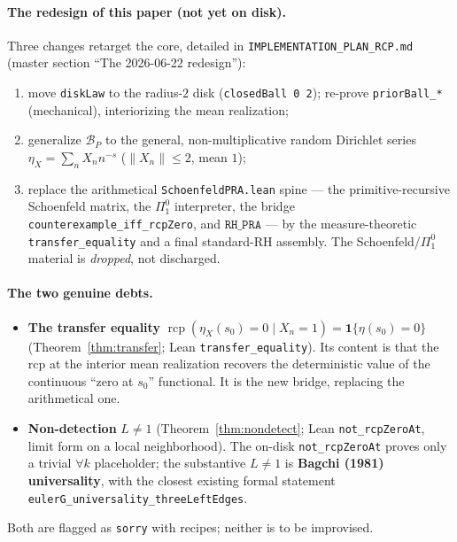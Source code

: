 \documentclass[11pt,a4paper]{article}
\theoremstyle{definition}
\newcommand{\etaX}{\eta_X}
\newcommand{\rcp}{\operatorname{rcp}}
\begin{document}
\paragraph{The redesign of this paper (not yet on disk).} Three changes retarget the core,
detailed in \texttt{IMPLEMENTATION\_PLAN\_RCP.md} (master section ``The 2026-06-22
redesign''):
\begin{enumerate}
  \item[\textbf{(R)}] move \texttt{diskLaw} to the radius-\(2\) disk (\texttt{closedBall 0
        2}); re-prove \texttt{priorBall\_*} (mechanical), interiorizing the mean realization;
  \item[\textbf{(M)}] generalize \(\mathcal{B}_P\) to the general, non-multiplicative random
        Dirichlet series \(\etaX=\sum_n X_n n^{-s}\) (\(\|X_n\|\le2\), mean \(1\));
  \item[\textbf{(Z)}] replace the arithmetical \texttt{SchoenfeldPRA.lean} spine --- the
        primitive-recursive Schoenfeld matrix, the \(\Pi^0_1\) interpreter, the bridge
        \texttt{counterexample\_iff\_rcpZero}, and \(\texttt{RH\_PRA}\) --- by the
        measure-theoretic \texttt{transfer\_equality} and a final standard-RH assembly. The
        Schoenfeld/\(\Pi^0_1\) material is \emph{dropped}, not discharged.
\end{enumerate}

\paragraph{The two genuine debts.}
\begin{itemize}
  \item \textbf{The transfer equality} \(\rcp(\etaX(s_0)=0\mid X_n=1)=\mathbf{1}\{\eta(s_0)
        =0\}\) (Theorem~\ref{thm:transfer}; Lean \texttt{transfer\_equality}). Its content is
        that the rcp at the interior mean realization recovers the deterministic value of the
        continuous ``zero at \(s_0\)'' functional. It is the new bridge, replacing the
        arithmetical one.
  \item \textbf{Non-detection} \(L\neq1\) (Theorem~\ref{thm:nondetect}; Lean
        \texttt{not\_rcpZeroAt}, limit form on a local neighborhood). The on-disk
        \texttt{not\_rcpZeroAt} proves only a trivial \(\forall k\) placeholder; the
        substantive \(L\neq1\) is \textbf{Bagchi (1981) universality}, with the closest
        existing formal statement \texttt{eulerG\_universality\_threeLeftEdges}.
\end{itemize}
Both are flagged as \texttt{sorry} with recipes; neither is to be improvised.
\end{document}
